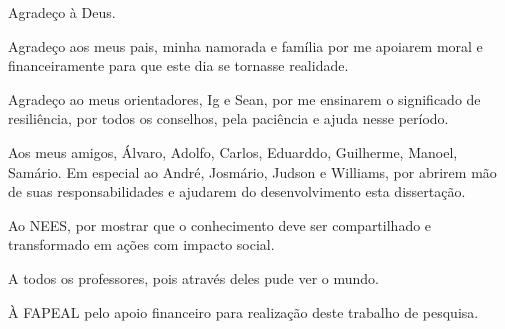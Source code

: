 \begin{agradecimentos}

Agradeço à Deus.

Agradeço aos meus pais, minha namorada e família por me apoiarem moral e financeiramente para que este dia se tornasse realidade.

Agradeço ao meus orientadores, Ig e Sean, por me ensinarem o significado de resiliência, por todos os conselhos, pela paciência e ajuda nesse período.

Aos meus amigos, Álvaro, Adolfo, Carlos, Eduarddo, Guilherme, Manoel, Samário. Em especial ao André, Josmário, Judson e Williams, por abrirem mão de suas responsabilidades e ajudarem do desenvolvimento esta dissertação.

Ao NEES, por mostrar que o conhecimento deve ser compartilhado e transformado em ações com impacto social. 

A todos os professores, pois através deles pude ver o mundo.

À FAPEAL pelo apoio financeiro para realização deste trabalho de pesquisa.

\end{agradecimentos}
